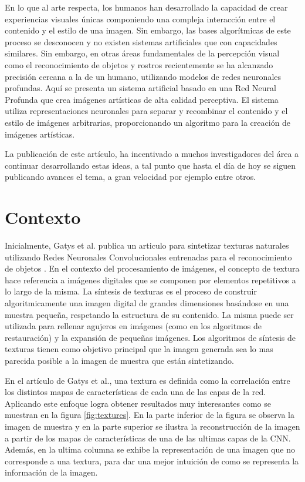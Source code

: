 \documentclass[a4paper,11pt,spanish]{book}
\begin{document}
      En lo que al arte respecta, los humanos han desarrollado la capacidad de crear experiencias visuales únicas componiendo una compleja interacción entre el contenido y el estilo de una imagen.
      Sin embargo, las bases algorítmicas de este proceso se desconocen y no existen sistemas artificiales que con capacidades similares. Sin embargo, en otras áreas fundamentales
      de la percepción visual como el reconocimiento de objetos y rostros recientemente se ha alcanzado precisión cercana a la de un humano, utilizando modelos de redes neuronales profundas.
      Aquí se presenta un sistema artificial basado en una Red Neural Profunda que crea imágenes artísticas de alta calidad perceptiva. El sistema utiliza representaciones neuronales
      para separar y recombinar el contenido y el estilo de imágenes arbitrarias, proporcionando un algoritmo para la creación de imágenes artísticas.
      
      La publicación de este artículo, ha incentivado a muchos investigadores del área a continuar desarrollando estas ideas, a tal punto que hasta el día de hoy se siguen publicando
      avances el tema, a gran velocidad por ejemplo \cite{Johnson2016Perceptual, UlyanovVL16, luan2017deep} entre otros.


    \section{Contexto}
      Inicialmente, Gatys et al. publica un articulo para sintetizar texturas naturales utilizando Redes Neuronales Convolucionales entrenadas para el reconocimiento de 
      objetos \cite{Gatys:Texture_Synthesis}. 
      En el contexto del procesamiento de imágenes, el concepto de textura hace referencia a imágenes digitales que se componen por elementos repetitivos a lo largo de la 
      misma.
      La síntesis de texturas es el proceso de construir algoritmicamente una imagen digital de grandes dimensiones basándose en una muestra pequeña, respetando la 
      estructura de su contenido. 
      La misma puede ser utilizada para rellenar agujeros en imágenes (como en los algoritmos de restauración) y la expansión de pequeñas imágenes.
      Los algoritmos de síntesis de texturas tienen como objetivo principal que la imagen generada sea lo mas parecida posible a la imagen de muestra que están sintetizando.
     
      En el artículo de Gatys et al., una textura es definida como la correlación entre los distintos mapas de características de cada una de las capas de la red. Aplicando este enfoque
      logra obtener resultados muy interesantes como se muestran en la figura \ref{fig:textures}. En la parte inferior de la figura se observa la imagen de muestra y en la parte superior
      se ilustra la reconstrucción de la imagen a partir de los mapas de características de una de las ultimas capas de la CNN. Además, en la ultima columna se exhibe la representación
      de una imagen que no corresponde a una textura, para dar una mejor intuición de como se representa la información de la imagen.
\end{document}
